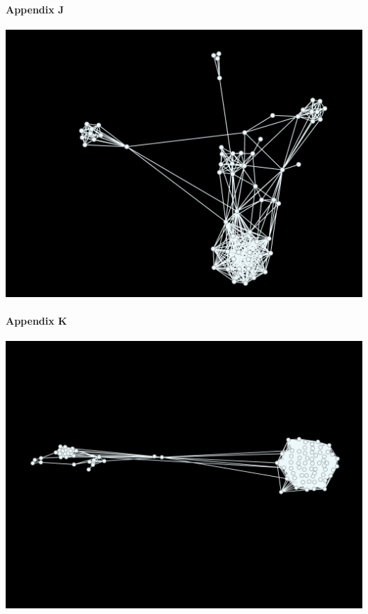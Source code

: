 \documentclass[11pt,twocolumn]{article}
\begin{document}
\paragraph{{\newline}Appendix J\newline\newline\newline\newline\newline}
\includegraphics[scale=0.22]{eigenvectorcentraility_pol.png}
\paragraph{Appendix K\newline\newline\newline\newline\newline}
\includegraphics[scale=0.22]{eigenvectorcentraility_tv.png}
\end{document}
